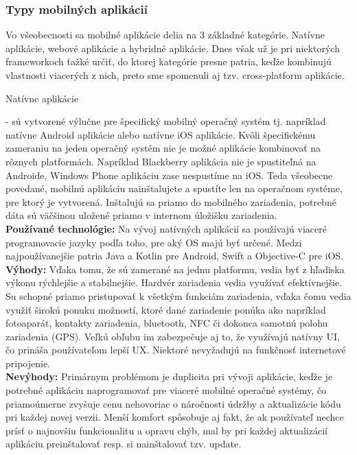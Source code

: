 \subsubsection{Typy mobilných aplikácií}
\label{sec:typy aplikacii}
Vo všeobecnosti sa mobilné aplikácie delia na 3 základné kategórie. Natívne aplikácie, webové aplikácie a hybridné aplikácie. Dnes však už je pri niektorých frameworkoch ťažké určiť, do ktorej kategórie presne patria, keďže kombinujú vlastnosti viacerých z nich, preto sme spomenuli aj tzv. cross-platform aplikácie.
\begin{itemize}[leftmargin=*]
{\bf \item Natívne aplikácie} - sú vytvorené výlučne pre špecifický mobilný operačný systém tj. napríklad natívne Android aplikácie alebo natívne iOS aplikácie. Kvôli špecifickému zameraniu na jeden operačný systém nie je možné aplikácie kombinovať na rôznych platformách. Napríklad Blackberry aplikácia nie je spustiteľná na Androide, Windows Phone aplikáciu zase nespustíme na iOS. Teda všeobecne povedané, mobilnú aplikáciu nainštalujete a spustíte len na operačnom systéme, pre ktorý je vytvorená. Inštalujú sa priamo do mobilného zariadenia, potrebné dáta sú väčšinou uložené priamo v internom úložišku zariadenia. \\

{\bf Používané technológie:} Na vývoj natívných aplikácií sa používajú viaceré programovacie jazyky podľa toho, pre aký OS majú byť určené. Medzi najpoužívanejšie patria Java a Kotlin pre Android, Swift a Objective-C pre iOS. \\

{\bf Výhody:} Vďaka tomu, že sú zamerané na jednu platformu, vedia byť z hľadiska výkonu rýchlejšie a stabilnejšie. Hardvér zariadenia vedia využívať efektívnejšie. Su schopné priamo pristupovať k všetkým funkciám zariadenia, vďaka čomu vedia využiť širokú ponuku možností, ktoré dané zariadenie ponúka ako napríklad fotoaparát, kontakty zariadenia, bluetooth, NFC či dokonca samotnú polohu zariadenia (GPS). Veľkú obľubu im zabezpečuje aj to, že využívajú natívny UI, čo prináša používateľom lepší UX. Niektoré nevyžadujú na funkčnosť internetové pripojenie. \\
 
{\bf Nevýhody:}  Primárnym problémom je duplicita pri vývoji aplikácie, keďže je potrebné aplikáciu naprogramovať pre viaceré mobilné operačné systémy, čo priamoúmerne zvyšuje cenu nehovoriac o náročnosti údržby a aktualizácie kódu pri každej novej verzii. Menší komfort spôsobuje aj fakt, že ak používateľ nechce prísť o najnovšiu funkcionalitu a opravu chýb, mal by pri každej aktualizácií aplikáciu preinštalovať resp. si nainštalovať tzv. update. \\


\end{itemize}
